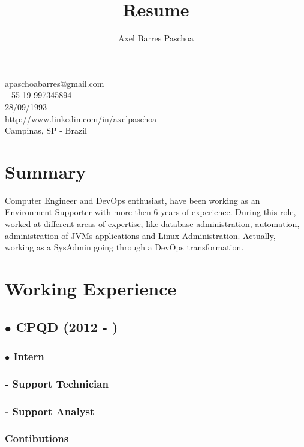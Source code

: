 \documentclass{article}
\makeatletter
\renewcommand{\maketitle}{

\begin{center}

{\huge\bfseries\theauthor}

apaschoabarres@gmail.com \\
+55 19 997345894 \\
28/09/1993 \\
http://www.linkedin.com/in/axelpaschoa \\
Campinas, SP - Brazil
\end{center}
}
\makeatother
\begin{document}
\title{Resume}
\author{Axel Barres Paschoa}

\maketitle

\section{Summary}

Computer Engineer and DevOps enthusiast, have been working as an Environment Supporter with more then 6 years of experience. During this role, worked at different areas of expertise, like database administration, automation, administration of JVMs applications and Linux Administration. Actually, working as a SysAdmin going through a DevOps transformation.


\section{Working Experience}

\subsection{$\bullet$ CPQD (2012 - )}

\subsubsection{$\bullet$ Intern}

\subsubsection{- Support Technician}

\subsubsection{- Support Analyst \\}

\subsubsection{Contibutions \\}
\end{document}
